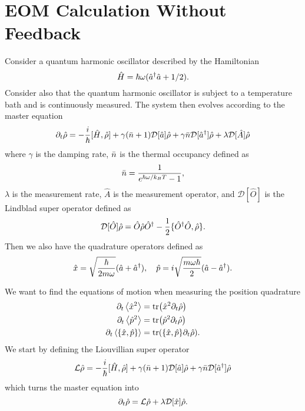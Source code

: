 \section{EOM Calculation Without Feedback}\label{app:eom}
Consider a quantum harmonic oscillator described by the Hamiltonian
\begin{equation}
    \hat{H} = \hbar \omega ( \hat{a}^{\dagger} \hat{a} + 1/2 ).
\end{equation}
Consider also that the quantum harmonic oscillator is subject to a temperature bath and is continuously measured. The system then evolves according to the master equation
\begin{equation}
    \partial_t \hat{\rho} = -\frac{i}{\hbar} [\hat{H}, \hat{\rho}] + \gamma (\bar{n} + 1 ) \mathcal{D}[\hat{a}] \hat{\rho} + \gamma \bar{n} \mathcal{D}[\hat{a}^{\dagger}] \hat{\rho} + \lambda \mathcal{D}[\hat{A}] \hat{\rho} \label{eq:app_master}
\end{equation}
where $\gamma$ is the damping rate, $\bar{n}$ is the thermal occupancy defined as 
\begin{equation}
    \bar{n} = \frac{1}{e^{\hbar \omega / k_B T} - 1},
\end{equation}
$\lambda$ is the measurement rate, $\hat{A}$ is the measurement operator, and $\mathcal{D}[\hat{O}]$ is the Lindblad super operator defined as
\begin{equation}
    \mathcal{D}[\hat{O}] \hat{\rho} = \hat{O} \hat{\rho} \hat{O}^\dagger - \frac{1}{2} \{ \hat{O}^\dagger \hat{O}, \hat{\rho} \}.
\end{equation}
Then we also have the quadrature operators defined as 
\begin{equation}
    \hat{x} = \sqrt{\frac{\hbar}{2 m \omega}} (\hat{a} + \hat{a}^{\dagger}), \quad \hat{p} = i \sqrt{\frac{m \omega \hbar}{2}} (\hat{a} - \hat{a}^{\dagger}).
\end{equation}

We want to find the equations of motion when measuring the position quadrature
\begin{align}
    \dt\expval{\xop^2} &= \tr(\xop^2 \dt \dmatrix)\label{eq:app_x2} \\
    \dt\expval{\pop^2} &= \tr(\pop^2 \dt \dmatrix)\label{eq:app_p2}\\
    \dt\expval{\acomm{\xop}{\pop}} &= \tr(\acomm{\xop}{\pop} \dt \dmatrix). \label{eq:app_xp}
\end{align}
We start by defining the Liouvillian super operator
\begin{equation}
    \mathcal{L}\hat{\rho} = -\frac{i}{\hbar} [\hat{H}, \hat{\rho}] + \gamma (\bar{n} + 1 ) \mathcal{D}[\hat{a}] \hat{\rho} + \gamma \bar{n} \mathcal{D}[\hat{a}^{\dagger}] \hat{\rho}
\end{equation}
which turns the master equation into
\begin{equation}
    \partial_t \hat{\rho} = \mathcal{L}\hat{\rho} + \lambda \mathcal{D}[\hat{x}] \hat{\rho}.
\end{equation}
